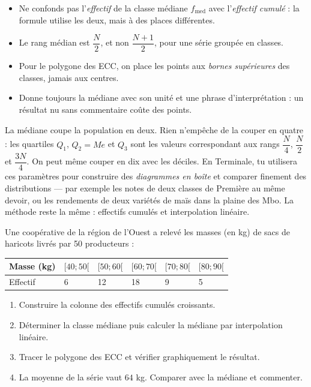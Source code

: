 \documentclass[11pt]{article}
\newcommand{\cle}[1]{{\popxbold\color{popdark}#1}}
\begin{document}
\begin{attention}
\begin{itemize}
\item Ne confonds pas l'\emph{effectif} de la classe médiane $f_{\text{med}}$ avec l'\emph{effectif cumulé} : la formule utilise les deux, mais à des places différentes.
\item Le rang médian est $\dfrac{N}{2}$, et non $\dfrac{N+1}{2}$, pour une série groupée en classes.
\item Pour le polygone des ECC, on place les points aux \emph{bornes supérieures} des classes, jamais aux centres.
\item Donne toujours la médiane avec son unité et une phrase d'interprétation : un résultat nu sans commentaire coûte des points.
\end{itemize}
\end{attention}

\begin{savaistu}
La médiane coupe la population en deux. Rien n'empêche de la couper en quatre : les \cle{quartiles} $Q_1$, $Q_2 = Me$ et $Q_3$ sont les valeurs correspondant aux rangs $\dfrac{N}{4}$, $\dfrac{N}{2}$ et $\dfrac{3N}{4}$. On peut même couper en dix avec les \cle{déciles}. En Terminale, tu utilisera ces paramètres pour construire des \emph{diagrammes en boîte} et comparer finement des distributions — par exemple les notes de deux classes de Première au même devoir, ou les rendements de deux variétés de maïs dans la plaine des Mbo. La méthode reste la même : effectifs cumulés et interpolation linéaire.
\end{savaistu}

\begin{exercice}
Une coopérative de la région de l'Ouest a relevé les masses (en kg) de sacs de haricots livrés par 50 producteurs :
\begin{center}
\begin{tabularx}{\linewidth}{|l|X|X|X|X|X|}
\hline
\rowcolor{popblueL} Masse (kg) & $[40;50[$ & $[50;60[$ & $[60;70[$ & $[70;80[$ & $[80;90[$ \\
\hline
Effectif & 6 & 12 & 18 & 9 & 5 \\
\hline
\end{tabularx}
\end{center}
\begin{enumerate}
\item Construire la colonne des effectifs cumulés croissants.
\item Déterminer la classe médiane puis calculer la médiane par interpolation linéaire.
\item Tracer le polygone des ECC et vérifier graphiquement le résultat.
\item La moyenne de la série vaut $64$ kg. Comparer avec la médiane et commenter.
\end{enumerate}
\end{exercice}
\end{document}
